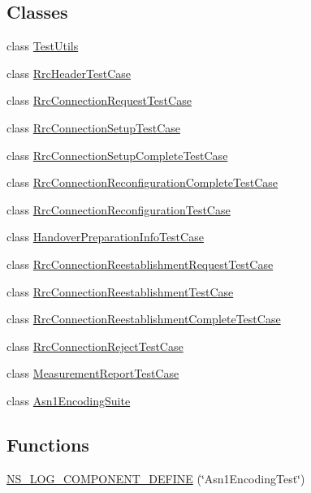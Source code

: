 \subsection*{Classes}
\begin{DoxyCompactItemize}
\item 
class \hyperlink{classTestUtils}{Test\+Utils}
\item 
class \hyperlink{classRrcHeaderTestCase}{Rrc\+Header\+Test\+Case}
\item 
class \hyperlink{classRrcConnectionRequestTestCase}{Rrc\+Connection\+Request\+Test\+Case}
\item 
class \hyperlink{classRrcConnectionSetupTestCase}{Rrc\+Connection\+Setup\+Test\+Case}
\item 
class \hyperlink{classRrcConnectionSetupCompleteTestCase}{Rrc\+Connection\+Setup\+Complete\+Test\+Case}
\item 
class \hyperlink{classRrcConnectionReconfigurationCompleteTestCase}{Rrc\+Connection\+Reconfiguration\+Complete\+Test\+Case}
\item 
class \hyperlink{classRrcConnectionReconfigurationTestCase}{Rrc\+Connection\+Reconfiguration\+Test\+Case}
\item 
class \hyperlink{classHandoverPreparationInfoTestCase}{Handover\+Preparation\+Info\+Test\+Case}
\item 
class \hyperlink{classRrcConnectionReestablishmentRequestTestCase}{Rrc\+Connection\+Reestablishment\+Request\+Test\+Case}
\item 
class \hyperlink{classRrcConnectionReestablishmentTestCase}{Rrc\+Connection\+Reestablishment\+Test\+Case}
\item 
class \hyperlink{classRrcConnectionReestablishmentCompleteTestCase}{Rrc\+Connection\+Reestablishment\+Complete\+Test\+Case}
\item 
class \hyperlink{classRrcConnectionRejectTestCase}{Rrc\+Connection\+Reject\+Test\+Case}
\item 
class \hyperlink{classMeasurementReportTestCase}{Measurement\+Report\+Test\+Case}
\item 
class \hyperlink{classAsn1EncodingSuite}{Asn1\+Encoding\+Suite}
\end{DoxyCompactItemize}
\subsection*{Functions}
\begin{DoxyCompactItemize}
\item 
\hyperlink{test-asn1-encoding_8cc_a4861c18df3abc919bb55bfd688b16971}{N\+S\+\_\+\+L\+O\+G\+\_\+\+C\+O\+M\+P\+O\+N\+E\+N\+T\+\_\+\+D\+E\+F\+I\+NE} (\char`\"{}Asn1\+Encoding\+Test\char`\"{})
\end{DoxyCompactItemize}

